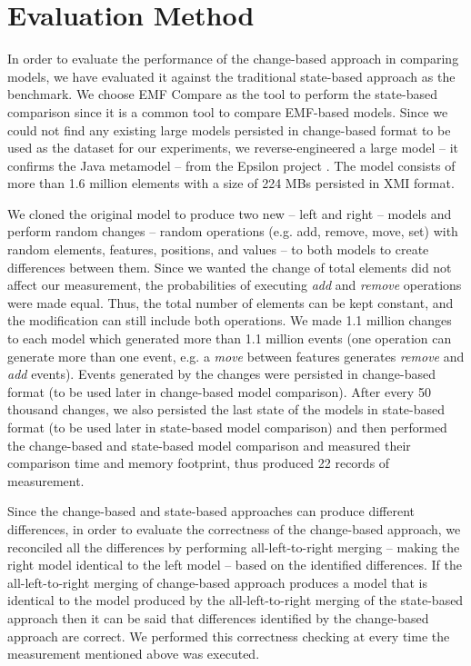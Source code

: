 \documentclass{llncs}
\begin{document}
\section{Evaluation Method}
\label{sec:evaluation}

In order to evaluate the performance of the change-based approach in comparing models, we have evaluated it against the traditional state-based approach as the benchmark. We choose EMF Compare \cite{emfcompare2018developer,eclipse2017compare} as the tool to perform the state-based comparison since it is a common tool to compare EMF-based models. Since we could not find any existing large models persisted in change-based format to be used as the dataset for our experiments, we reverse-engineered a large model -- it confirms the Java metamodel \cite{eclipse2018modiscojava} -- from the Epsilon project \cite{eclipse2018epsilongit,eclipse2017epsilon}. The model consists of more than 1.6 million elements with a size of 224 MBs persisted in XMI format. 

We cloned the original model to produce two new -- left and right -- models and perform random changes -- random operations (e.g. add, remove, move, set) with random elements, features, positions, and values -- to both models to create differences between them. Since we wanted the change of total elements did not affect our measurement, the probabilities of executing \textit{add} and \textit{remove} operations were made equal. Thus, the total number of elements can be kept constant, and the modification can still include both operations. We made 1.1 million changes to each model which generated more than 1.1 million events (one operation can generate more than one event, e.g. a \textit{move} between features generates \textit{remove} and \textit{add} events). Events generated by the changes were persisted in change-based format (to be used later in change-based model comparison). After every 50 thousand changes, we also persisted the last state of the models in state-based format (to be used later in state-based model comparison) and then performed the change-based and state-based model comparison and measured their comparison time and memory footprint, thus produced 22 records of measurement. 

Since the change-based and state-based approaches can produce different differences, in order to evaluate the correctness of the change-based approach, we reconciled all the differences by performing all-left-to-right merging -- making the right model identical to the left model -- based on the identified differences. If the all-left-to-right merging of change-based approach produces a model that is identical to the model produced by the all-left-to-right merging of the state-based approach then it can be said that differences identified by the change-based approach are correct. We performed this correctness checking at every time the measurement mentioned above was executed.
\end{document}
